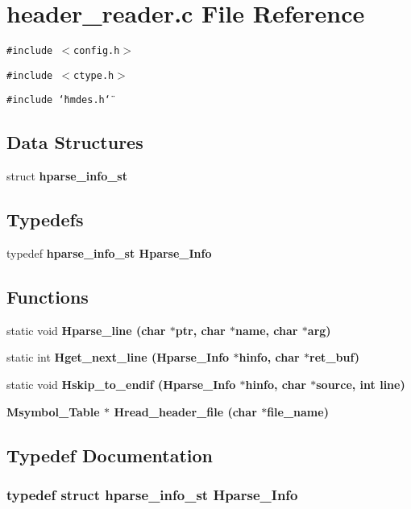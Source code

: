 \section{header\_\-reader.c File Reference}
\label{header__reader_8c}
{\tt \#include $<$config.h$>$}\par
{\tt \#include $<$ctype.h$>$}\par
{\tt \#include \char`\"{}hmdes.h\char`\"{}}\par
\subsection*{Data Structures}
\begin{CompactItemize}
\item 
struct \bf{hparse\_\-info\_\-st}
\end{CompactItemize}
\subsection*{Typedefs}
\begin{CompactItemize}
\item 
typedef \bf{hparse\_\-info\_\-st} \bf{Hparse\_\-Info}
\end{CompactItemize}
\subsection*{Functions}
\begin{CompactItemize}
\item 
static void \bf{Hparse\_\-line} (char $\ast$ptr, char $\ast$\bf{name}, char $\ast$arg)
\item 
static int \bf{Hget\_\-next\_\-line} (\bf{Hparse\_\-Info} $\ast$hinfo, char $\ast$ret\_\-buf)
\item 
static void \bf{Hskip\_\-to\_\-endif} (\bf{Hparse\_\-Info} $\ast$hinfo, char $\ast$source, int line)
\item 
\bf{Msymbol\_\-Table} $\ast$ \bf{Hread\_\-header\_\-file} (char $\ast$file\_\-name)
\end{CompactItemize}


\subsection{Typedef Documentation}
\subsubsection{\setlength{\rightskip}{0pt plus 5cm}typedef struct \bf{hparse\_\-info\_\-st}
 \bf{Hparse\_\-Info}}\label{header__reader_8c_1c7a4795de9ad80203df10f8f5b59d98}




